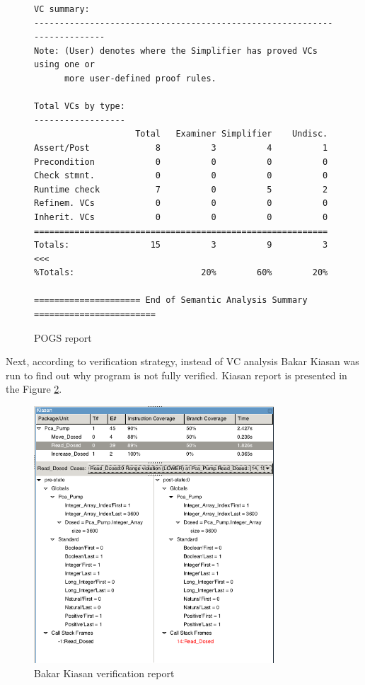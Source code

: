 \begin{figure}
\begin{lstlisting}[frame=single, gobble=0]
VC summary:
-------------------------------------------------------------------------
Note: (User) denotes where the Simplifier has proved VCs using one or
      more user-defined proof rules.

Total VCs by type:
------------------
                    Total   Examiner Simplifier    Undisc.
Assert/Post             8          3          4          1
Precondition            0          0          0          0
Check stmnt.            0          0          0          0
Runtime check           7          0          5          2
Refinem. VCs            0          0          0          0
Inherit. VCs            0          0          0          0
==========================================================
Totals:                15          3          9          3 <<<
%Totals:                         20%        60%        20%

===================== End of Semantic Analysis Summary ========================
\end{lstlisting}
\doublespacing
\caption{POGS report}
\label{listing:pcapump_dosemonitor_pogs}
\end{figure}

Next, according to verification strategy, instead of VC analysis Bakar Kiasan was run to find out why program is not fully verified. Kiasan report is presented in the Figure \ref{figure:sparkverification:kiasanreport1}.

\begin{figure}[ht]%
    \begin{center}
        \includegraphics[width=0.8\textwidth]{figures/pca-pump-verification-step1.png}        
    \end{center}    
    \caption{Bakar Kiasan verification report}
    \label{figure:sparkverification:kiasanreport1}
\end{figure}

